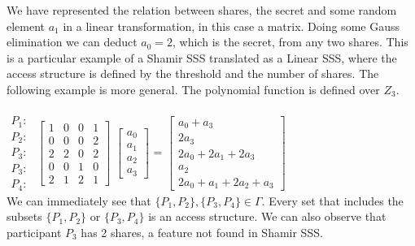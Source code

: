 \documentclass[12pt, a4paper, oneside]{book}
\begin{document}
    We have represented the relation between shares, the secret and some random element $a_1$ in a linear transformation, in this case a matrix. Doing some Gauss elimination we can deduct $a_0{=}2$, which is the secret, from any two shares. This is a particular example of a Shamir SSS translated as a Linear SSS, where the access structure is defined by the threshold and the number of shares.
    The following example is more general. The polynomial function is defined over $Z_3$.
    \\~\\
    {
    \vspace{-1.5cm}
        $
        \begin{matrix}
        P_1:\\
        P_2:\\
        P_3:\\
        P_3:\\
        P_4:
        \end{matrix}
        $
    \vspace{-0,5cm}
        $
        \begin{bmatrix}
        1 & 0 & 0 & 1\\
        0 & 0 & 0 & 2\\
        2 & 2 & 0 & 2\\
        0 & 0 & 1 & 0\\
        2 & 1 & 2 & 1
        \end{bmatrix}
        $
        $
        \begin{bmatrix}
        a_0\\
        a_1\\
        a_2\\
        a_3
        \end{bmatrix}
        $
        {=}
        $
        \begin{bmatrix}
        a_0 {+} a_3\\
        2a_3\\
        2a_0 {+} 2a_1 {+} 2a_3\\
        a_2\\
        2a_0 {+} a_1 {+} 2a_2 {+} a_3
        \end{bmatrix}
        $
    }
    \vspace{2.3cm}
    \\
    
    We can immediately see that $ \{P_1, P_2\}, \{P_3, P_4\} \in \Gamma $. Every set that includes the subsets $ \{P_1, P_2\} $ or $ \{P_3, P_4\} $ is an access structure. We can also observe that participant $ P_3 $ has 2 shares, a feature not found in Shamir SSS. \\
\end{document}
